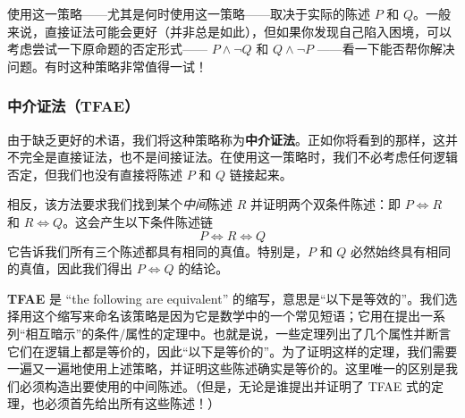 使用这一策略——尤其是何时使用这一策略——取决于实际的陈述 $P$ 和 $Q$。一般来说，直接证法可能会更好（并非总是如此），但如果你发现自己陷入困境，可以考虑尝试一下原命题的否定形式—— $P \land \neg Q$ 和 $Q \land \neg P$ ——看一下能否帮你解决问题。有时这种策略非常值得一试！

\subsubsection*{中介证法（TFAE）}

由于缺乏更好的术语，我们将这种策略称为\textbf{中介证法}。正如你将看到的那样，这并不完全是直接证法，也不是间接证法。在使用这一策略时，我们不必考虑任何逻辑否定，但我们也没有直接将陈述 $P$ 和 $Q$ 链接起来。

相反，该方法要求我们找到某个\emph{中间}陈述 $R$ 并证明两个双条件陈述：即 $P \iff R$ 和 $R \iff Q$。这会产生以下条件陈述链
\[P \iff R \iff Q\]
它告诉我们所有三个陈述都具有相同的真值。特别是，$P$ 和 $Q$ 必然始终具有相同的真值，因此我们得出 $P \iff Q$ 的结论。

\textbf{TFAE} 是 ``the following are equivalent'' 的缩写，意思是``以下是等效的''。我们选择用这个缩写来命名该策略是因为它是数学中的一个常见短语；它用在提出一系列``相互暗示''的条件/属性的定理中。也就是说，一些定理列出了几个属性并断言它们在逻辑上都是等价的，因此``以下是等价的''。为了证明这样的定理，我们需要一遍又一遍地使用上述策略，并证明这些陈述确实是等价的。这里唯一的区别是我们必须构造出要使用的中间陈述。（但是，无论是谁提出并证明了 TFAE 式的定理，也必须首先给出所有这些陈述！）

\begin{center}
    \noindent {}
\end{center}